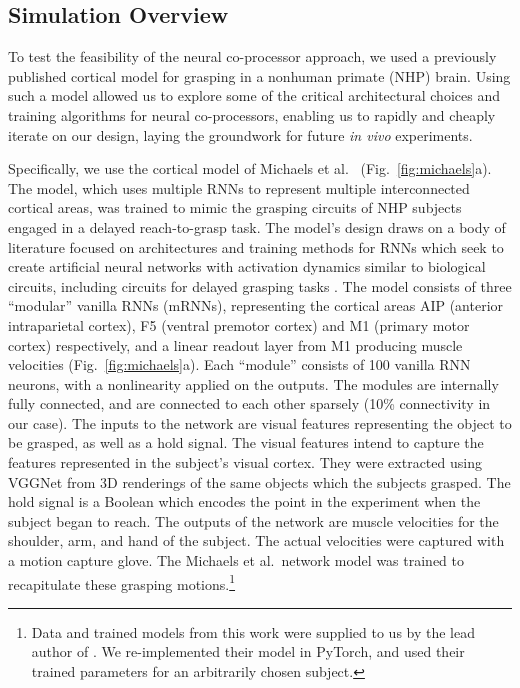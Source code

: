 \documentclass[12pt]{iopart}
\begin{document}
\subsection{Simulation Overview}
To test the feasibility of the neural co-processor approach, we used a previously published cortical model for
grasping in a nonhuman primate (NHP) brain. Using such a model allowed us to explore some of the critical
architectural choices and training algorithms for neural co-processors, enabling us to rapidly and cheaply iterate on our
design, laying the groundwork for future \textit{in vivo} experiments. 

Specifically, we use the cortical model of Michaels et al.\ \cite{michaels.mrnn}
(Fig.~\ref{fig:michaels}a). The model, which uses multiple RNNs to represent multiple interconnected cortical areas,
was trained to mimic the grasping circuits of NHP subjects engaged in a delayed reach-to-grasp task.
The model's design draws on a body of literature focused on architectures and training methods for RNNs which
seek to create artificial neural networks with activation dynamics similar to biological circuits,
including circuits for delayed grasping tasks \cite{sussillo.mrnn}. The model consists of three
``modular'' vanilla RNNs (mRNNs), representing the cortical areas AIP (anterior intraparietal cortex), F5 (ventral
premotor cortex) and M1 (primary motor cortex) respectively, and a linear readout layer from M1 producing muscle
velocities (Fig.~\ref{fig:michaels}a). Each ``module'' consists of 100 vanilla RNN neurons, with a nonlinearity
applied on the outputs. The modules are internally fully connected, and are connected to each other sparsely
(10\% connectivity in our case). The inputs to the network are visual features
representing the object to be grasped, as well as a hold signal. The visual features
intend to capture the features represented in the subject's visual cortex. They were extracted using
VGGNet \cite{simonyan.vgg} from 3D renderings of the same objects which the subjects grasped. The hold signal is
a Boolean which encodes the point in the experiment when the subject began to reach. The outputs of the
network are muscle velocities for the shoulder, arm, and hand of the subject. The actual
velocities were captured with a motion capture glove. The Michaels et al.\ network model 
was trained to recapitulate these grasping motions.\footnote{Data and trained models from this work
were supplied to us by the lead author of \cite{michaels.mrnn}. We re-implemented their model in PyTorch,
and used their trained parameters for an arbitrarily chosen subject.} 
\end{document}
